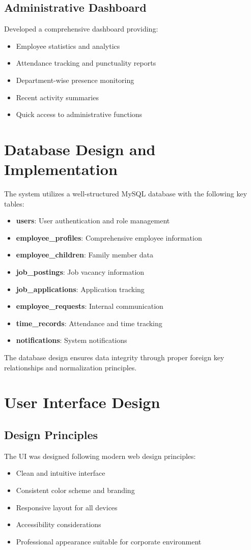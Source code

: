 \subsection{Administrative Dashboard}
Developed a comprehensive dashboard providing:
\begin{itemize}
    \item Employee statistics and analytics
    \item Attendance tracking and punctuality reports
    \item Department-wise presence monitoring
    \item Recent activity summaries
    \item Quick access to administrative functions
\end{itemize}

\section{Database Design and Implementation}

The system utilizes a well-structured MySQL database with the following key tables:

\begin{itemize}
    \item \textbf{users}: User authentication and role management
    \item \textbf{employee\_profiles}: Comprehensive employee information
    \item \textbf{employee\_children}: Family member data
    \item \textbf{job\_postings}: Job vacancy information
    \item \textbf{job\_applications}: Application tracking
    \item \textbf{employee\_requests}: Internal communication
    \item \textbf{time\_records}: Attendance and time tracking
    \item \textbf{notifications}: System notifications
\end{itemize}

The database design ensures data integrity through proper foreign key relationships and normalization principles.

\section{User Interface Design}

\subsection{Design Principles}
The UI was designed following modern web design principles:
\begin{itemize}
    \item Clean and intuitive interface
    \item Consistent color scheme and branding
    \item Responsive layout for all devices
    \item Accessibility considerations
    \item Professional appearance suitable for corporate environment
\end{itemize}

